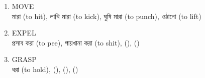 \documentclass[11pt,a4paper,twocolumn]{article}
\begin{document}
{\begin{enumerate}
		\item MOVE\\
		\textcolor{hlit}{মারা} (to hit), \textcolor{hlit}{লাথি মারা} (to kick), 
		\textcolor{hlit}{ঘুষি মারা} (to punch), \textcolor{hlit}{ওঠানো} (to lift)\\
		
		\item EXPEL\\
		\textcolor{hlit}{প্রসাব করা} (to pee), \textcolor{hlit}{পায়খানা করা} (to shit), 
		\textcolor{hlit}{}(), \textcolor{hlit}{} ()\\
		
		\item GRASP\\
		\textcolor{hlit}{ধরা} (to hold), \textcolor{hlit}{} (), 
		\textcolor{hlit}{} (), \textcolor{hlit}{} ()\\
			
	
	\end{enumerate}
	
	}
\end{document}
